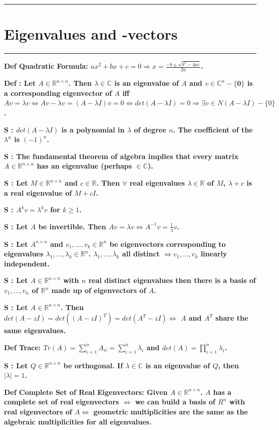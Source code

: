 \documentclass[7pt,landscape, margin = 0.1mm]{article}
\newcommand{\titellinie}{\rule{1.\linewidth}{0.75pt}}
\newcommand*{\mysection}[2][black]{\vskip 0pt \titellinie\vspace{-20pt}\section{#2}\vspace{-14pt}\titellinie \colorlet{chaptercolor}{#1}}
\newcommand{\DEF}[2]{\color{chaptercolor}\bf{Def #1}:\color{black}    \hspace{0.2cm} #2}
\newcommand{\SA}[2]{\color{chaptercolor}\bf{S #1}:\color{black}    \hspace{0.2cm} #2}
\begin{document}
\begin{multicols}{4}
\begin{flushleft}
{\mysection[Magenta]{\centering Eigenvalues and -vectors}
\DEF{Quadratic Formula}{$ax^2+bx+c=0 \Rightarrow x=\frac{-b\pm\sqrt{b^2-4ac}}{2a}$.}

\DEF{}{Let $A\in\mathbb{R}^{n\times n}$. Then $\lambda\in\mathbb{C}$ is an eigenvalue of $A$ and $v\in\mathbb{C}^n-\{\bm{0}\}$ is a corresponding eigenvector of $A$ iff $Av=\lambda v \Leftrightarrow Av-\lambda v = (A-\lambda I)v = 0 \Leftrightarrow det(A-\lambda I)=0 \Rightarrow \exists v\in N(A-\lambda I) - \{0\}$.}

\SA{}{$det(A-\lambda I)$ is a polynomial in $\lambda$ of degree $n$. The coefficient of the $\lambda^n$ is $(-1)^n$.}

\SA{}{The fundamental theorem of algebra implies that every matrix $A\in\mathbb{R}^{n\times n}$ has an eigenvalue (perhaps $\in\mathbb{C}$).}

\SA{}{Let $M\in\mathbb{R}^{n\times n}$ and $c\in\mathbb{R}$. Then $\forall$ real eigenvalues $\lambda\in\mathbb{R}$ of $M$, $\lambda+c$ is a real eigenvalue of $M+cI$.}

\SA{}{$A^kv=\lambda^kv$ for $k\geq1$.}

\SA{}{Let $A$ be invertible. Then $Av=\lambda v \Leftrightarrow A^{-1}v=\frac{1}{\lambda}v$.}

\SA{}{Let $A^{n\times n}$ and $v_1,...,v_k\in\mathbb{R}^n$ be eigenvectors corresponding to eigenvalues $\lambda_1,...,\lambda_k\in\mathbb{R}^n$. $\lambda_1,...,\lambda_k$ all distinct $\Leftrightarrow v_1,...,v_k$ linearly independent.}

\SA{}{Let $A\in\mathbb{R}^{n\times n}$ with $n$ real distinct eigenvalues then there is a basis of $v_1,...,v_n$ of $\mathbb{R}^n$ made up of eigenvectors of $A$.}

\SA{}{Let $A\in\mathbb{R}^{n\times n}$. Then $det(A-zI)=det((A-zI)^T)=det(A^T-zI) \Leftrightarrow$ $A$ and $A^T$ share the same eigenvalues.}

\DEF{Trace}{$Tr(A)=\sum_{i=1}^nA_{ii}=\sum_{i=1}^n\lambda_i$ and $det(A)=\prod_{i=1}^n\lambda_i$.}

\SA{}{Let $Q\in\mathbb{R}^{n\times n}$ be orthogonal. If $\lambda\in\mathbb{C}$ is an eigenvalue of $Q$, then $|\lambda|=1$.}

\DEF{Complete Set of Real Eigenvectors}{Given $A\in\mathbb{R}^{n\times n}$. $A$ has a complete set of real eigenvectors $\Leftrightarrow$ we can build a basis of $R^n$ with real eigenvectors of $A \Leftrightarrow$ geometric multiplicities are the same as the algebraic multiplicities for all eigenvalues.}

}
\end{flushleft}
\end{multicols}
\end{document}
